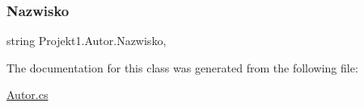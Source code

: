 \subsubsection{\texorpdfstring{Nazwisko}{Nazwisko}}
{\footnotesize\ttfamily string Projekt1.\+Autor.\+Nazwisko\hspace{0.3cm}{\ttfamily [get]}, {}}



The documentation for this class was generated from the following file\+:\begin{DoxyCompactItemize}
\item 
\mbox{\hyperlink{_autor_8cs}{Autor.\+cs}}\end{DoxyCompactItemize}
